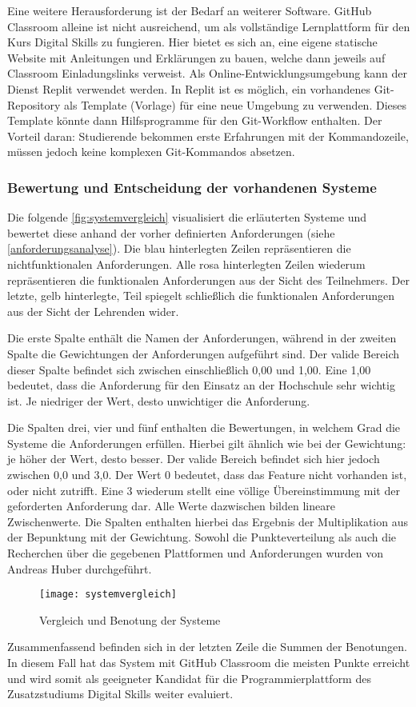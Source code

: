 Eine weitere Herausforderung ist der Bedarf an weiterer Software. GitHub
Classroom alleine ist nicht ausreichend, um als vollständige Lernplattform für
den Kurs Digital Skills zu fungieren. Hier bietet es sich an, eine eigene
statische Website mit Anleitungen und Erklärungen zu bauen, welche dann jeweils
auf Classroom Einladungslinks verweist. Als Online-Entwicklungsumgebung kann der
Dienst Replit verwendet werden. In Replit ist es möglich, ein vorhandenes
Git-Repository als Template (Vorlage) für eine neue Umgebung zu verwenden.
Dieses Template könnte dann Hilfsprogramme für den Git-Workflow enthalten. Der
Vorteil daran: Studierende bekommen erste Erfahrungen mit der Kommandozeile,
müssen jedoch keine komplexen Git-Kommandos absetzen.

\subsubsection{Bewertung und Entscheidung der vorhandenen Systeme}
Die folgende \autoref{fig:systemvergleich} visualisiert die erläuterten Systeme
und bewertet diese anhand der vorher definierten Anforderungen (siehe
\autoref{anforderungsanalyse}). Die blau hinterlegten Zeilen repräsentieren
die nichtfunktionalen Anforderungen. Alle rosa hinterlegten Zeilen wiederum
repräsentieren die funktionalen Anforderungen aus der Sicht des Teilnehmers. Der
letzte, gelb hinterlegte, Teil spiegelt schließlich die funktionalen
Anforderungen aus der Sicht der Lehrenden wider.

Die erste Spalte enthält die Namen der Anforderungen, während in der zweiten
Spalte die Gewichtungen der Anforderungen aufgeführt sind. Der valide Bereich
dieser Spalte befindet sich zwischen einschließlich 0,00 und 1,00. Eine 1,00
bedeutet, dass die Anforderung für den Einsatz an der Hochschule sehr wichtig
ist. Je niedriger der Wert, desto unwichtiger die Anforderung.

Die Spalten drei, vier und fünf enthalten die Bewertungen, in welchem Grad die
Systeme die Anforderungen erfüllen. Hierbei gilt ähnlich wie bei der Gewichtung:
je höher der Wert, desto besser. Der valide Bereich befindet sich hier jedoch
zwischen 0,0 und 3,0. Der Wert 0 bedeutet, dass das Feature nicht vorhanden ist,
oder nicht zutrifft. Eine 3 wiederum stellt eine völlige Übereinstimmung mit der
geforderten Anforderung dar. Alle Werte dazwischen bilden lineare Zwischenwerte.
Die Spalten enthalten hierbei das Ergebnis der Multiplikation aus der Bepunktung
mit der Gewichtung. Sowohl die Punkteverteilung als auch die Recherchen über die
gegebenen Plattformen und Anforderungen wurden von Andreas Huber durchgeführt.

\begin{figure}[H]
    \centering
    \texttt{[image: systemvergleich]}
    \caption{Vergleich und Benotung der Systeme}
    \label{fig:systemvergleich}
\end{figure}

\newpage

Zusammenfassend befinden sich in der letzten Zeile die Summen der Benotungen. In
diesem Fall hat das System mit GitHub Classroom die meisten Punkte erreicht und
wird somit als geeigneter Kandidat für die Programmierplattform des
Zusatzstudiums Digital Skills weiter evaluiert.